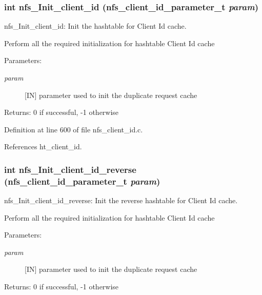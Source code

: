 \subsubsection{\setlength{\rightskip}{0pt plus 5cm}int nfs\_\-Init\_\-client\_\-id (nfs\_\-client\_\-id\_\-parameter\_\-t {\em param})}\label{nfs__client__id_8c_a18}


nfs\_\-Init\_\-client\_\-id: Init the hashtable for Client Id cache.

Perform all the required initialization for hashtable Client Id cache

\begin{Desc}
\item[Parameters:]
\begin{description}
\item[{\em param}][IN] parameter used to init the duplicate request cache\end{description}
\end{Desc}
\begin{Desc}
\item[Returns:]0 if successful, -1 otherwise \end{Desc}


Definition at line 600 of file nfs\_\-client\_\-id.c.

References ht\_\-client\_\-id.
\subsubsection{\setlength{\rightskip}{0pt plus 5cm}int nfs\_\-Init\_\-client\_\-id\_\-reverse (nfs\_\-client\_\-id\_\-parameter\_\-t {\em param})}\label{nfs__client__id_8c_a19}


nfs\_\-Init\_\-client\_\-id\_\-reverse: Init the reverse hashtable for Client Id cache.

Perform all the required initialization for hashtable Client Id cache

\begin{Desc}
\item[Parameters:]
\begin{description}
\item[{\em param}][IN] parameter used to init the duplicate request cache\end{description}
\end{Desc}
\begin{Desc}
\item[Returns:]0 if successful, -1 otherwise \end{Desc}


